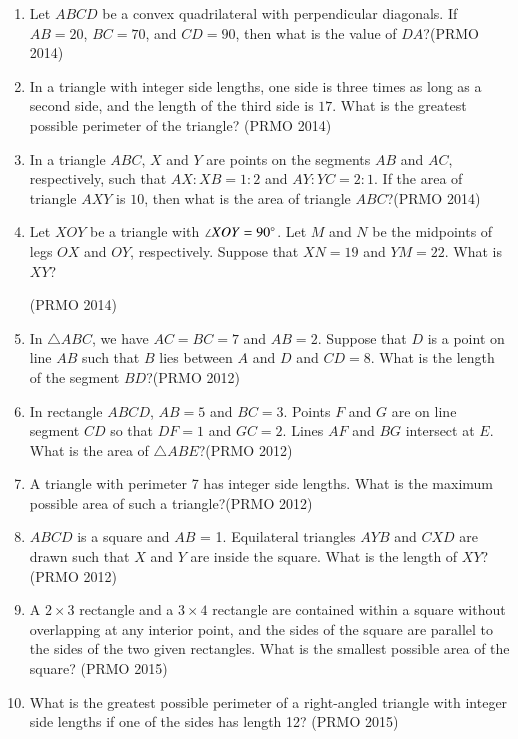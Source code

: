 \begin{enumerate}[label=\thesubsection.\arabic*,ref=\thesubsection.\theenumi]
    \item Let $ABCD$ be a convex quadrilateral with perpendicular diagonals. If $AB = 20$, $BC = 70$, and $CD = 90$, then what is the value of $DA$?\hfill(PRMO 2014)
    \item In a triangle with integer side lengths, one side is three times as long as a second side, and the length of the third side is $17$. What is the greatest possible perimeter of the triangle? \hfill(PRMO 2014)
    \item In a triangle $ABC$, $X$ and $Y$ are points on the segments $AB$ and $AC$, respectively, such that $ AX : XB = 1 : 2 $ and $ AY : YC = 2 : 1$. If the area of triangle $AXY$ is $10$, then what is the area of triangle $ABC$?\hfill(PRMO 2014)
    \item Let $XOY$ be a triangle with $\angle XOY = 90\degree$. Let $M$ and $N$ be the midpoints of legs $OX$ and $OY$, respectively. Suppose that $XN = 19$ and $YM = 22$. What is $XY$?

	    \hfill(PRMO 2014)
\item In $\triangle ABC$, we have $AC = BC = 7$ and $AB = 2$. Suppose that $D$ is a point on line $AB$ such that $B$ lies between $A$ and $D$ and $CD = 8$. What is the length of the segment $BD$?\hfill(PRMO 2012)
\item In rectangle $ABCD$, $AB = 5$ and $BC = 3$. Points $F$ and $G$ are on line segment $CD$ so that $DF = 1$ and $GC = 2$. Lines $AF$ and $BG$ intersect at $E$. What is the area of $\triangle ABE$?\hfill(PRMO 2012)
\item A triangle with perimeter 7 has integer side lengths. What is the maximum possible area of such a triangle?\hfill(PRMO 2012)
\item $ABCD$ is a square and $AB$ = 1. Equilateral triangles $AYB$ and $CXD$ are drawn such that $X$ and $Y$ are inside the square. What is the length of $XY$?\hfill(PRMO 2012)
    \item A $ 2 \times 3 $ rectangle and a $ 3 \times 4 $ rectangle are contained within a square without overlapping at any interior point, and the sides of the square are parallel to the sides of the two given rectangles. What is the smallest possible area of the square? \hfill(PRMO 2015)

    \item What is the greatest possible perimeter of a right-angled triangle with integer side lengths if one of the sides has length 12? \hfill(PRMO 2015)




\end{enumerate}
